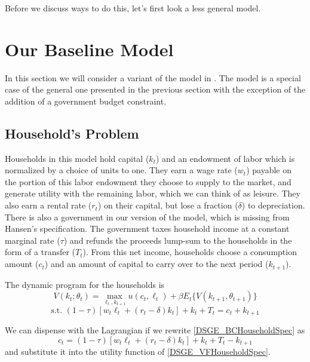 \documentclass[letterpaper,12pt]{article}
\theoremstyle{definition}
\begin{document}
\begin{spacing}{1.5}
		Before we discuss ways to do this, let's first look a less general model.

\section{Our Baseline Model}\label{DSGE_BaselineDSGE}
	In this section we will consider a variant of the model in \citet{Hansen1985}. The model is a special case of the general one presented in the previous section with the exception of the addition of a government budget constraint.

	\subsection{Household's Problem}
		Households in this model hold capital ($k_t$) and an endowment of labor which is normalized by a choice of units to one. They earn a wage rate ($w_t$) payable on the portion of this labor endowment they choose to supply to the market, and generate utility with the remaining labor, which we can think of as leisure. They also earn a rental rate ($r_t$) on their capital, but lose a fraction ($\delta$) to depreciation. There is also a government in our version of the model, which is missing from Hansen's specification. The government taxes household income at a constant marginal rate ($\tau$) and refunds the proceeds lump-sum to the households in the form of a transfer ($T_t$). From this net income, households choose a consumption amount ($c_t$) and an amount of capital to carry over to the next period ($k_{t+1}$).

		The dynamic program for the households is
		\begin{equation}\label{DSGE_VFHouseholdSpec}
		 V(k_t;\theta_t) = \max_{\ell_t,k_{t+1}} u(c_t,\ell_t) + \beta E_t\{V(k_{t+1},\theta_{t+1})\}
		\end{equation}
		\begin{equation}\label{DSGE_BCHouseholdSpec}
		\text{s.t. } (1-\tau) \left[w_t\ell_t+(r_t-\delta)k_t\right] + k_t + T_t = c_t+k_{t+1}
		\end{equation}

		We can dispense with the Lagrangian if we rewrite \eqref{DSGE_BCHouseholdSpec} as
		\begin{equation}\label{DSGE_ConsDef}
		c_t = (1-\tau) \left[w_t\ell_t+(r_t-\delta)k_t\right] + k_t + T_t-k_{t+1}
		\end{equation}
		and substitute it into the utility function of \eqref{DSGE_VFHouseholdSpec}.


\end{spacing}
\end{document}
